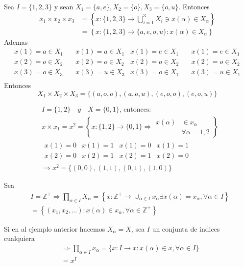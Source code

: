 \begin{ejemplo}
    Sea $I=\{1,2,3\}$ y sean $X_1=\{a,e\},X_2=\{o\},X_3=\{o,u\}$. Entonces 
    \begin{align*}
        x_1\times x_2\times x_3 &= \left\{x:\{1,2,3\}\to \bigcup_{i=1}^3 X_i\ni x(\alpha)\in X_\alpha\right\}\\
        &= \left\{x:\{1,2,3\}\to \{a,e,o,u\}: x(\alpha)\in X_\alpha\right\}
    \end{align*}
    Ademas 
    \begin{align*}
        x(1) = a\in X_1 \quad & x(1) = a\in X_1 & x(1) = e\in X_1 \quad& x(1) = e\in X_1\\
        x(2) = o\in X_2 \quad & x(2) = o\in X_2  & x(2) = o\in X_2  \quad& x(2) = o\in X_2\\
        x(3) = o\in X_3 \quad & x(3) = u\in X_3 & x(3) = o\in X_1  \quad& x(3) = u\in X_1\\
    \end{align*}
    Entonces 
    $$X_1\times X_2\times X_3=\{(a,o,o),(a,o,u),(e,o,o),(e,o,u)\}$$
\end{ejemplo}

\begin{ejemplo}
    $$
\begin{aligned}
&I=\{1,2\} \quad y \quad X=\{0,1\} \text {, entonces: } \\
& x \times x_1=x^2=\left\{x:\{1,2\} \rightarrow\{0,1\} \Rightarrow \begin{array}{rl}
x(\alpha) & \in x_{\alpha} \\
& \forall \alpha=1,2
\end{array}\right\} \\
& \begin{array}{l|l|l|l}
x(1)=0 & x(1)=1 & x(1)=0 & x(1)=1 \\
x(2)=0 & x(2)=1 & x(2)=1 & x(2)=0
\end{array} \\
& \Rightarrow x^2=\{(0,0),(1,1),(0,1),(1,0)\}
\end{aligned}
$$
\end{ejemplo}

\begin{ejemplo}
    Sea 
    $$
\begin{aligned}
& I=\mathbb{Z}^{+} \Rightarrow \prod_{\alpha \in I} X_\alpha=\left\{x: \mathbb{Z}^{+} \rightarrow \cup_{\alpha \in I} x_\alpha \exists x(\alpha)=x_{\alpha},\forall \alpha \in I\right\} \\
& =\left\{\left(x_1, x_2, \ldots\right): x(\alpha) \in x_\alpha, \forall \alpha \in \mathbb{Z}^{+}\right\}
\end{aligned}
$$
\end{ejemplo}
\begin{ejemplo}
    Si en al ejemplo anterior hacemos $X_\alpha=X$, sea $I$ un conjunta de indices cualquiera
$$
\begin{aligned}
& \Rightarrow \prod_{\alpha \in I} x_\alpha =\{x: I \rightarrow x: x(\alpha) \in x, \forall \alpha \in I\} \\
&=x^I
\end{aligned}
$$
\end{ejemplo}

